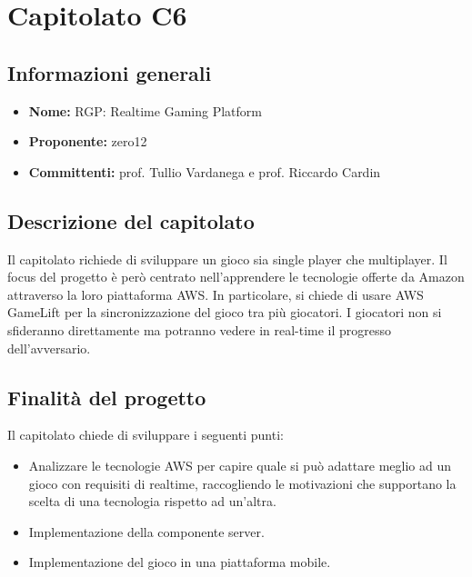 \section{Capitolato C6}

\subsection{Informazioni generali}
\begin{itemize}
\item \textbf{Nome:} RGP: Realtime Gaming Platform
\item \textbf{Proponente:} zero12
\item \textbf{Committenti:} prof. Tullio Vardanega e prof. Riccardo Cardin
\end{itemize}

\subsection{Descrizione del capitolato}
Il capitolato richiede di sviluppare un gioco sia single player che multiplayer.
Il focus del progetto è però centrato nell'apprendere le tecnologie offerte da Amazon attraverso la loro piattaforma AWS.
In particolare, si chiede di usare AWS GameLift per la sincronizzazione del gioco tra più giocatori.
I giocatori non si sfideranno direttamente ma potranno vedere in real-time il progresso dell'avversario.

\subsection{Finalità del progetto}
Il capitolato chiede di sviluppare i seguenti punti:
\begin{itemize}
\item Analizzare le tecnologie AWS per capire quale si può adattare meglio ad un gioco con requisiti di realtime, raccogliendo le motivazioni che supportano la scelta di una tecnologia rispetto ad un'altra.
\item Implementazione della componente server.
\item Implementazione del gioco in una piattaforma mobile.
\end{itemize}

